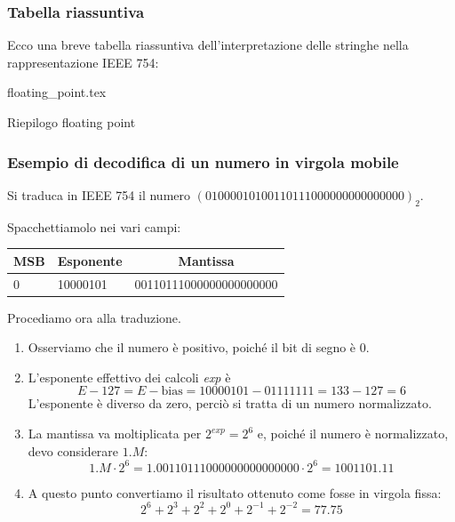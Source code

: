 \documentclass[class=book, crop=false, oneside]{standalone}
\begin{document}
\subsubsection{Tabella riassuntiva}
Ecco una breve tabella riassuntiva dell'interpretazione delle stringhe nella rappresentazione IEEE 754:
\begin{table}[h!]
	\centering
	{floating_point.tex}
	\caption{Riepilogo floating point}
\end{table}

\subsubsection{Esempio di decodifica di un numero in virgola mobile}
Si traduca in IEEE 754 il numero \((01000010 10011011 10000000 00000000)_2\).

Spacchettiamolo nei vari campi:
\begin{table}[h!]
	\centering
	\begin{tabular}{|l|l|l|}
		\hline
		\multicolumn{1}{|c|}{MSB} & \multicolumn{1}{c|}{Esponente} & \multicolumn{1}{c|}{Mantissa} \\ \hline
		0 & 10000101 & 00110111000000000000000\\\hline
	\end{tabular}
\end{table}
Procediamo ora alla traduzione.
\begin{enumerate}
	\item Osserviamo che il numero è positivo, poiché il bit di segno è 0.
	\item L'esponente effettivo dei calcoli \emph{exp} è
	\begin{equation*}
		E - 127 = E - \text{bias} = 10000101 - 01111111 = 133 - 127 = 6
	\end{equation*}
	L'esponente è diverso da zero, perciò si tratta di un numero normalizzato.
	\item La mantissa va moltiplicata per \(2^{exp} = 2^{6}\) e, poiché il numero è normalizzato, devo considerare $1.M$:
	\begin{equation*}
		1.M \cdot 2^{6} = 1.00110111000000000000000 \cdot 2^{6} = 1001101.11
	\end{equation*}
	\item A questo punto convertiamo il risultato ottenuto come fosse in virgola fissa:
	\begin{equation*}
		2^{6} + 2^{3} + 2^{2} + 2^{0} + 2^{-1} + 2^{-2} = 77.75
	\end{equation*}
\end{enumerate}
\end{document}
